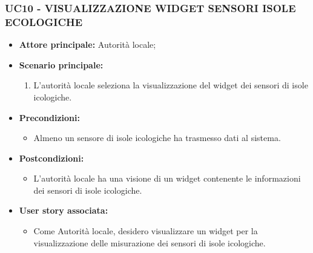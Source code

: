 \subsubsection{UC10 - VISUALIZZAZIONE WIDGET SENSORI ISOLE ECOLOGICHE}
\begin{itemize}
    \item \textbf{Attore principale:} Autorità locale;
    \item \textbf{Scenario principale:}
          \begin{enumerate}
              \item L'autorità locale seleziona la visualizzazione del widget dei sensori di isole icologiche.
          \end{enumerate}
    \item \textbf{Precondizioni:}
          \begin{itemize}
              \item  Almeno un sensore di isole icologiche ha trasmesso dati al sistema.
          \end{itemize}
    \item \textbf{Postcondizioni:}
          \begin{itemize}
              \item  L'autorità locale ha una visione di un widget contenente le informazioni dei sensori di isole icologiche.
          \end{itemize}
    \item \textbf{User story associata:}
          \begin{itemize}
              \item Come Autorità locale, desidero visualizzare un widget per la visualizzazione delle misurazione dei sensori di isole icologiche.
          \end{itemize}
\end{itemize}